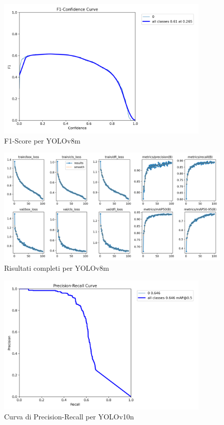 \documentclass[12pt]{article}
\begin{document}
\begin{figure}[H]
    \centering
    \includegraphics[width=0.9\textwidth]{./img/F1_curve-yolov8m.png}
    \caption{F1-Score per YOLOv8m}
    \label{fig:yolov8m-f1-score}
\end{figure}

\begin{figure}[H]
    \centering
    \includegraphics[width=1.1\textwidth]{./img/results-yolov8m.png}
    \caption{Risultati completi per YOLOv8m}
    \label{fig:yolov8m-results}
\end{figure}
\begin{figure}[H]
    \centering
    \includegraphics[width=0.9\textwidth]{./img/PR_curve-yolov10n.png}
    \caption{Curva di Precision-Recall per YOLOv10n}
    \label{fig:yolov10n-pr-curve}
\end{figure}
\end{document}
